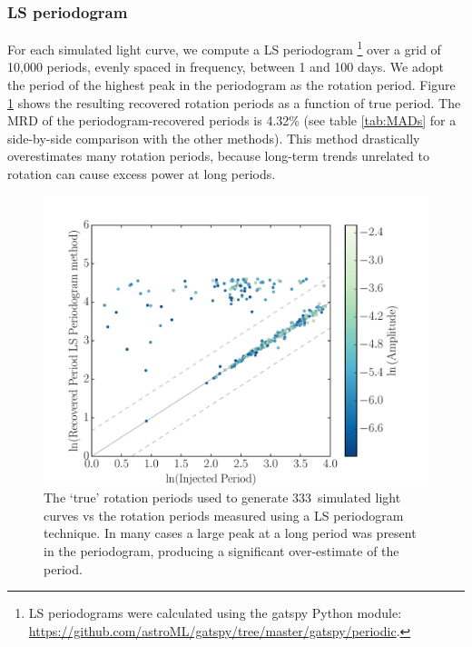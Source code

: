 \documentclass[useAMS, usenatbib, preprint, 12pt]{aastex}
\newcommand{\naigrain}{333}
\newcommand{\percentpgramMAD}{4.32}
\begin{document}
\subsubsection{LS periodogram}
\label{sec:ls}

For each simulated light curve, we compute a LS periodogram
\footnote{LS periodograms were calculated using the gatspy Python module:
\url{https://github.com/astroML/gatspy/tree/master/gatspy/periodic}.}
over a grid of 10,000 periods, evenly spaced in frequency,
between 1 and 100 days.
We adopt the period of the highest peak in the periodogram as the rotation
period.
Figure \ref{fig:pgram_compare} shows the resulting recovered rotation periods
as a function of true period.
The MRD of the periodogram-recovered periods is \percentpgramMAD\% (see table
\ref{tab:MADs} for a side-by-side comparison with the other methods).
This method drastically overestimates many rotation periods,
because long-term trends unrelated to rotation can cause excess power
at long periods.

\begin{figure}
\begin{center}
\includegraphics[width=6in, clip=true]{figures/compare_pgram.pdf}
\caption[LS periodogram results.]
{The `true' rotation periods used to generate \naigrain\ simulated light
curves vs the rotation periods measured using a LS periodogram technique.
In many cases a large peak at a long period was present in the periodogram,
    producing a significant over-estimate of the period.
    }
\label{fig:pgram_compare}
\end{center}
\end{figure}
\end{document}
